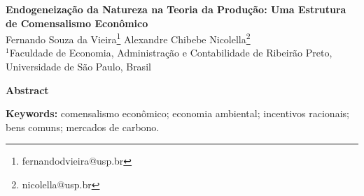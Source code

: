 \documentclass[a4paper,12pt,twoside,brazil,english,nottoc,notbib]{abntex2}
\begin{document}

\pagestyle{bodypage}

\setcounter{page}{1}
\thispagestyle{empty}

\begin{center}

    {\Large \bfseries Endogeneização da Natureza na Teoria da Produção: Uma Estrutura de Comensalismo Econômico}\\[0.8cm]

    Fernando Souza da Vieira\footnote{fernandodvieira@usp.br} \quad Alexandre Chibebe Nicolella\footnote{nicolella@usp.br}\\[0.3cm]

    {\small $^{1}$Faculdade de Economia, Administração e Contabilidade de Ribeirão Preto, Universidade de São Paulo, Brasil}

\end{center}

\noindent\textbf{Abstract}

\vspace{0.2cm}



\vspace{0.4cm}

\noindent\textbf{Keywords:} comensalismo econômico; economia ambiental; incentivos racionais; bens comuns; mercados de carbono.

\vspace{0.8cm}

















\end{document}
